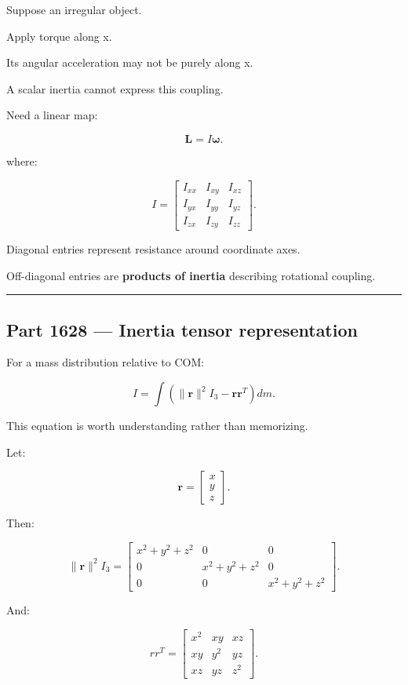 Suppose an irregular object.

Apply torque along x.

Its angular acceleration may not be purely along x.

A scalar inertia cannot express this coupling.

Need a linear map:

\[
\boxed{
\mathbf{L}
=
I\boldsymbol{\omega}.
}
\]

where:

\[
I=
\begin{bmatrix}
I_{xx}&I_{xy}&I_{xz}\\
I_{yx}&I_{yy}&I_{yz}\\
I_{zx}&I_{zy}&I_{zz}
\end{bmatrix}.
\]

Diagonal entries represent resistance around coordinate axes.

Off-diagonal entries are \textbf{products of inertia} describing rotational coupling.

\begin{center}\rule{0.5\linewidth}{0.5pt}\end{center}

\subsection{Part 1628 --- Inertia tensor representation}\label{06-engine-ii-ch035-part-1628-inertia-tensor-representation}

For a mass distribution relative to COM:

\[
\boxed{
I
=
\int
\left(
\|\mathbf{r}\|^2I_3
-
\mathbf{r}\mathbf{r}^T
\right)
dm.
}
\]

This equation is worth understanding rather than memorizing.

Let:

\[
\mathbf{r}
=
\begin{bmatrix}
x\\y\\z
\end{bmatrix}.
\]

Then:

\[
\|\mathbf{r}\|^2I_3
=
\begin{bmatrix}
x^2+y^2+z^2 &0&0\\
0&x^2+y^2+z^2&0\\
0&0&x^2+y^2+z^2
\end{bmatrix}.
\]

And:

\[
rr^T
=
\begin{bmatrix}
x^2&xy&xz\\
xy&y^2&yz\\
xz&yz&z^2
\end{bmatrix}.
\]

